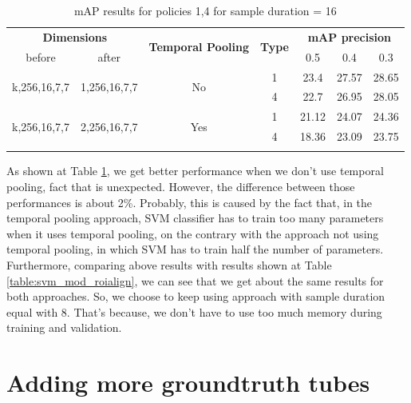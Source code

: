 \documentclass{report}
\begin{document}
\begin{center}
\begin{longtable}{||c | c| c| c||c c c||}

  \hline
 \multicolumn{2}{||c|}{\textbf{Dimensions}} & \multirow{2}{4.5em}{\textbf{Temporal Pooling}} &\multirow{2}{*}{ \textbf{Type}} &\multicolumn{3}{|c||}{\textbf{mAP precision}}\\

  before & after & {} & {} &  0.5 &  0.4 & 0.3 \\
  \hline   \hline

  \multirow{2}{*}{k,256,16,7,7} & \multirow{2}{*}{1,256,16,7,7} & \multirow{2}{*}{No}  & 1 & 23.4 & 27.57 &28.65  \\
  \cline{4-7}
  {} & {} & {} & 4 & 22.7 & 26.95 & 28.05 \\
  \hline

  \multirow{2}{*}{k,256,16,7,7} & \multirow{2}{*}{2,256,16,7,7} & \multirow{2}{*}{Yes}  & 1 & 21.12 & 24.07 & 24.36  \\
  \cline{4-7}
  {} & {} & {} & 4 & 18.36 & 23.09 & 23.75 \\
  \hline
  \caption{mAP results for  policies 1,4  for sample duration = 16 }
  \label{table:svm_temp_pooling_16}
\end{longtable} 
\end{center}

As shown at Table \ref{table:svm_temp_pooling_16}, we get better performance when we don't use temporal pooling, fact that is unexpected.
However, the difference between those performances is about 2\%. Probably, this is caused by the fact that, in the temporal pooling approach,
SVM classifier has to train too many parameters when it uses temporal pooling, on the contrary with the approach not using temporal pooling,
in which SVM has to train half the number of parameters. Furthermore, comparing above results with results shown at Table  \ref{table:svm_mod_roialign}, we can see that we get about the same results for both approaches. So, we choose to keep using approach with sample duration equal
with 8. That's because, we don't have to use too much memory during training and validation.

\section{Adding more groundtruth tubes}
\end{document}
